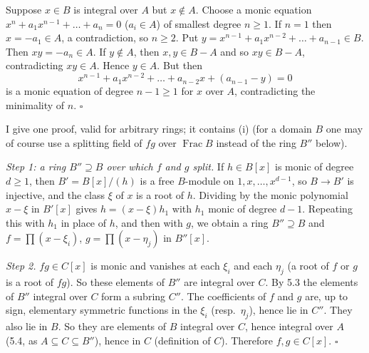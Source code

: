 \documentclass[11pt]{article}
\begin{document}
\pf
Suppose $x\in B$ is integral over $A$ but $x\notin A$. Choose a monic equation $x^n+a_1x^{n-1}+\dots+a_n=0$ ($a_i\in A$) of smallest degree $n\ge1$. If $n=1$ then $x=-a_1\in A$, a contradiction, so $n\ge2$. Put $y=x^{n-1}+a_1x^{n-2}+\dots+a_{n-1}\in B$. Then $xy=-a_n\in A$. If $y\notin A$, then $x,y\in B-A$ and so $xy\in B-A$, contradicting $xy\in A$. Hence $y\in A$. But then
\[
x^{n-1}+a_1x^{n-2}+\dots+a_{n-2}x+(a_{n-1}-y)=0
\]
is a monic equation of degree $n-1\ge1$ for $x$ over $A$, contradicting the minimality of $n$. \hfill$\square$

\pf
I give one proof, valid for arbitrary rings; it contains (i) (for a domain $B$ one may of course use a splitting field of $fg$ over $\operatorname{Frac}B$ instead of the ring $B''$ below).

\emph{Step 1: a ring $B''\supseteq B$ over which $f$ and $g$ split.} If $h\in B[x]$ is monic of degree $d\ge1$, then $B'=B[x]/(h)$ is a free $B$-module on $1,x,\dots,x^{d-1}$, so $B\to B'$ is injective, and the class $\xi$ of $x$ is a root of $h$. Dividing by the monic polynomial $x-\xi$ in $B'[x]$ gives $h=(x-\xi)h_1$ with $h_1$ monic of degree $d-1$. Repeating this with $h_1$ in place of $h$, and then with $g$, we obtain a ring $B''\supseteq B$ and $f=\prod(x-\xi_i)$, $g=\prod(x-\eta_j)$ in $B''[x]$.

\emph{Step 2.} $fg\in C[x]$ is monic and vanishes at each $\xi_i$ and each $\eta_j$ (a root of $f$ or $g$ is a root of $fg$). So these elements of $B''$ are integral over $C$. By 5.3 the elements of $B''$ integral over $C$ form a subring $C''$. The coefficients of $f$ and $g$ are, up to sign, elementary symmetric functions in the $\xi_i$ (resp.\ $\eta_j$), hence lie in $C''$. They also lie in $B$. So they are elements of $B$ integral over $C$, hence integral over $A$ (5.4, as $A\subseteq C\subseteq B''$), hence in $C$ (definition of $C$). Therefore $f,g\in C[x]$. \hfill$\square$
\end{document}
